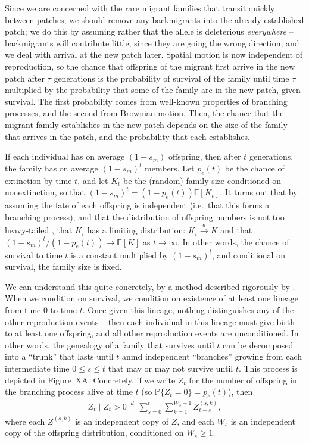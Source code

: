 \documentclass{article}
\renewcommand{\P}{\mathbb{P}}
\newcommand{\E}{\mathbb{E}}
\newcommand{\dconv}{\xrightarrow{d}}
\newcommand{\deq}{\stackrel{\scriptscriptstyle{d}}{=}}
\begin{document}
Since we are concerned with the rare migrant families that transit quickly between patches, 
we should remove any backmigrants into the already-established patch;
we do this by assuming rather that the allele is deleterious \emph{everywhere} --
backmigrants will contribute little, since they are going the wrong direction,
and we deal with arrival at the new patch later.
Spatial motion is now independent of reproduction,
so the chance that offspring of the migrant first arrive in the new patch after $\tau$ generations 
is the probability of survival of the family until time $\tau$
multiplied by the probability that some of the family are in the new patch, given survival.
The first probability comes from well-known properties of branching processes,
and the second from Brownian motion.
Then, the chance that the migrant family establishes in the new patch 
depends on the size of the family that arrives in the patch,
and the probability that each establishes.

If each individual has on average $(1-s_m)$ offspring, then after $t$ generations,
the family has on average $(1-s_m)^t$ members.
Let $p_e(t)$ be the chance of extinction by time $t$, and let $K_t$ be the (random) family size conditioned on nonextinction,
so that $(1-s_m)^t = (1-p_e(t))\E[K_t]$.
It turns out that by assuming the fate of each offspring is independent (i.e.\ that this forms a branching process),
and that the distribution of offspring numbers is not too heavy-tailed \citep[see][for details]{jaegers1976branching},
that $K_t$ has a limiting distribution: $K_t \dconv K$ 
and that $(1-s_m)^{t}/(1-p_e(t)) \to \E[K]$ as $t \to \infty$.
In other words, the chance of survival to time $t$ is a constant multiplied by $(1-s_m)^t$,
and conditional on survival, the family size is fixed.

We can understand this quite concretely, by a method described rigorously by \citet{geiger1999elementary}.
When we condition on survival, we condition on existence of at least one lineage from time $0$ to time $t$.
Once given this lineage, nothing distinguishes any of the other reproduction events --
then each individual in this lineage must give birth to at least one offspring,
and all other reproduction events are unconditioned.
In other words, the genealogy of a family that survives until $t$
can be decomposed into a ``trunk'' that lasts until $t$
anmd independent ``branches'' growing from each intermediate time $0\le s \le t$ 
that may or may not survive until $t$.
This process is depicted in Figure~XA.
Concretely, if we write $Z_t$ for the number of offspring in the branching process alive at time $t$
(so $\P\{Z_t = 0\} = p_e(t)$),
then
\begin{align}
  Z_t \; \vert \; Z_t>0 \deq \sum_{s=0}^t \sum_{k=1}^{W_s-1} Z^{(s,k)}_{t-s},
\end{align}
where each $Z^{(s,k)}$ is an independent copy of $Z$,
and each $W_s$ is an independent copy of the offspring distribution, conditioned on $W_s \ge 1$.
\end{document}
